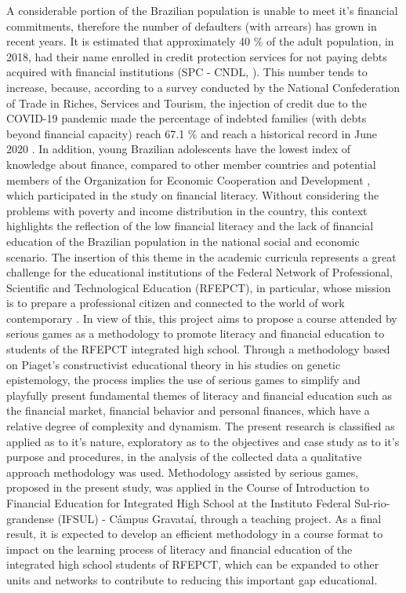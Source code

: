 A considerable portion of the Brazilian population is unable to meet it's financial commitments, therefore the number of defaulters (with arrears) has grown in recent years. It is estimated that approximately 40 {\%} of the adult population, in 2018, had their name enrolled in credit protection services for not paying debts acquired with financial institutions (SPC - CNDL, \citeyear{spc2018}). This number tends to increase, because, according to a survey conducted by the National Confederation of Trade in Riches, Services and Tourism, the injection of credit due to the COVID-19 pandemic made the percentage of indebted families (with debts beyond financial capacity) reach 67.1 {\%} and reach a historical record in June 2020 \cite{cnc2020}. In addition, young Brazilian adolescents have the lowest index of knowledge about finance, compared to other member countries and potential members of the Organization for Economic Cooperation and Development \cite{oecd2017}, which participated in the study on financial literacy. Without considering the problems with poverty and income distribution in the country, this context highlights the reflection of the low financial literacy and the lack of financial education of the Brazilian population in the national social and economic scenario. The insertion of this theme in the academic curricula represents a great challenge for the educational institutions of the Federal Network of Professional, Scientific and Technological Education (RFEPCT), in particular, whose mission is to prepare a professional citizen and connected to the world of work contemporary \cite{brasil2008}. In view of this, this project aims to propose a course attended by serious games as a methodology to promote literacy and financial education to students of the RFEPCT integrated high school. Through a methodology based on Piaget's constructivist educational theory in his studies on genetic epistemology, the process implies the use of serious games to simplify and playfully present fundamental themes of literacy and financial education such as the financial market, financial behavior and personal finances, which have a relative degree of complexity and dynamism. The present research is classified as applied as to it's nature, exploratory as to the objectives and case study as to it's purpose and procedures, in the analysis of the collected data a qualitative approach methodology was used. Methodology assisted by serious games, proposed in the present study, was applied in the Course of Introduction to Financial Education for Integrated High School at the Instituto Federal Sul-rio-grandense (IFSUL) - Câmpus Gravataí, through a teaching project. As a final result, it is expected to develop an efficient methodology in a course format to impact on the learning process of literacy and financial education of the integrated high school students of RFEPCT, which can be expanded to other units and networks to contribute to reducing this important gap educational.